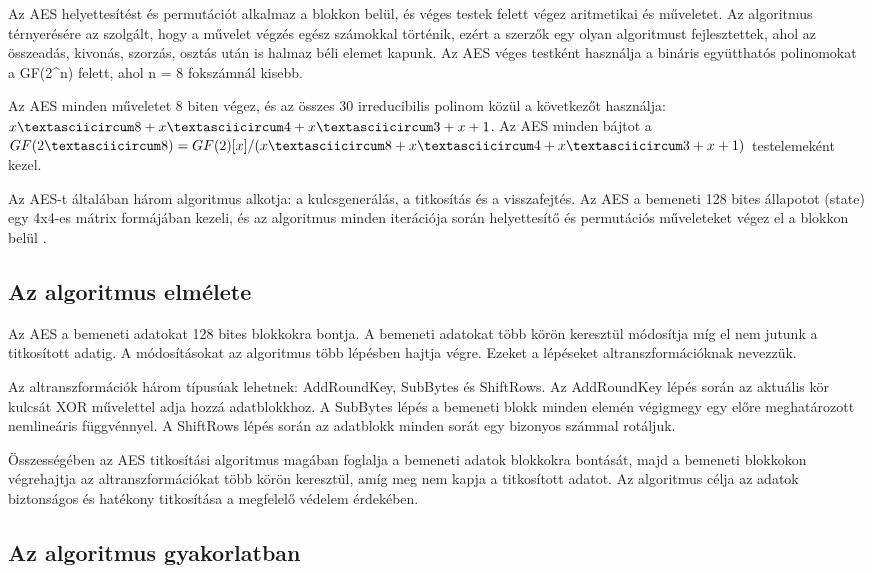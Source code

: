 Az AES helyettesítést és permutációt alkalmaz a blokkon belül, és véges testek felett végez aritmetikai és műveletet. Az algoritmus térnyerésére az szolgált, hogy a művelet végzés egész számokkal történik, ezért a szerzők egy olyan algoritmust fejlesztettek, ahol az összeadás, kivonás, szorzás, osztás után is halmaz béli elemet kapunk. Az AES véges testként használja a bináris együtthatós polinomokat a GF(2\textasciicircum n) felett, ahol n = 8 fokszámnál kisebb.

Az AES minden műveletet 8 biten végez, és az összes 30 irreducibilis polinom közül a következőt használja: $x\textasciicircum 8 + x\textasciicircum 4 + x\textasciicircum 3 + x + 1$. Az AES minden bájtot a $GF(2\textasciicircum 8) = GF(2)[x]/(x\textasciicircum 8 + x\textasciicircum 4 + x\textasciicircum 3 + x + 1)$ testelemeként kezel.

Az AES-t általában három algoritmus alkotja: a kulcsgenerálás, a titkosítás és a visszafejtés. Az AES a bemeneti 128 bites állapotot (state) egy 4x4-es mátrix formájában kezeli, és az algoritmus minden iterációja során helyettesítő és permutációs műveleteket végez el a blokkon belül \cite{Marton}.

\subsection {Az algoritmus elmélete}

Az AES a bemeneti adatokat 128 bites blokkokra bontja. A bemeneti adatokat több körön keresztül módosítja míg el nem jutunk a titkosított adatig. A módosításokat az algoritmus több lépésben hajtja végre. Ezeket a lépéseket altranszformációknak nevezzük.

Az altranszformációk három típusúak lehetnek: AddRoundKey, SubBytes és ShiftRows. Az AddRoundKey lépés során az aktuális kör kulcsát XOR művelettel adja hozzá adatblokkhoz. A SubBytes lépés a bemeneti blokk minden elemén végigmegy egy előre meghatározott nemlineáris függvénnyel. A ShiftRows lépés során az adatblokk minden sorát egy bizonyos számmal rotáljuk.

Összességében az AES titkosítási algoritmus magában foglalja a bemeneti adatok blokkokra bontását, majd a bemeneti blokkokon végrehajtja az altranszformációkat több körön keresztül, amíg meg nem kapja a titkosított adatot. Az algoritmus célja az adatok biztonságos és hatékony titkosítása a megfelelő védelem érdekében.

\subsection {Az algoritmus gyakorlatban}

